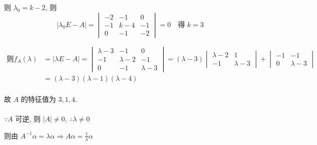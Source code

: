          则 \( \lambda_{0} = k - 2 \), 则
         \[ |\lambda_{0}E - A| = \begin{vmatrix}
                 -2 & -1    & 0  \\
                 -1 & k - 4 & -1 \\
                 0  & -1    & -2
             \end{vmatrix} = 0 \quad \text{得 } k = 3 \]

         \( \begin{aligned} \text{则}
             f_{A}(\lambda) & = |\lambda E - A| = \begin{vmatrix}
                                                      \lambda - 3 & -1          & 0           \\
                                                      -1          & \lambda - 2 & -1          \\
                                                      0           & -1          & \lambda - 3
                                                  \end{vmatrix} = (\lambda - 3)
             \begin{vmatrix}
                 \lambda - 2 & 1           \\
                 -1          & \lambda - 3
             \end{vmatrix} +
             \begin{vmatrix}
                 -1 & -1          \\
                 0  & \lambda - 3
             \end{vmatrix}                                                             \\
                            & = (\lambda - 3)(\lambda - 1)(\lambda - 4)                   \\
         \end{aligned} \)

         故 \( A \) 的特征值为 \( 3, 1, 4 \).


     \paragraph{} %
         \( \because A \) 可逆, 则 \( |A| \neq 0 \), \( \therefore \lambda \neq 0 \)

         则由 \( A^{-1}\alpha = \lambda\alpha \Rightarrow A\alpha = \frac{1}{\lambda}\alpha \)

